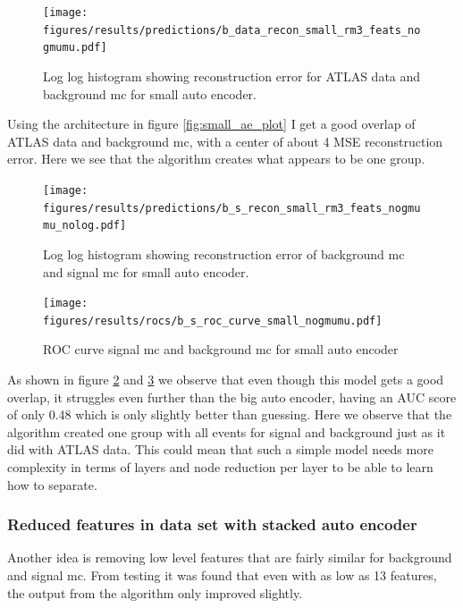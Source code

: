 \documentclass[ reprint, amsmath,amssymb, aps, nofootinbib]{revtex4-2}
\begin{document}
\begin{figure}[H]
     \centering
         \texttt{[image: figures/results/predictions/b\_data\_recon\_small\_rm3\_feats\_nogmumu.pdf]}
         \caption{Log log histogram showing reconstruction error for ATLAS data and background mc for small auto encoder. }
     \label{fig:data_b_small_pred}
\end{figure}

Using the architecture in figure \ref{fig:small_ae_plot} I get a good overlap of ATLAS data and background mc, with a center of about 4 MSE reconstruction error. Here we see that the algorithm creates what appears to be one group. 

\begin{figure}[H]    
 \centering
    \texttt{[image: figures/results/predictions/b\_s\_recon\_small\_rm3\_feats\_nogmumu\_nolog.pdf]}
    \caption{Log log histogram showing reconstruction error of background mc and signal mc for small auto encoder. }
    \label{fig:s_b_small_pred_}   
  
\end{figure}

\begin{figure}[H]    
  \centering
         \texttt{[image: figures/results/rocs/b\_s\_roc\_curve\_small\_nogmumu.pdf]}
         \caption{ROC curve signal mc and background mc for small auto encoder}
         \label{fig:s_b_small_roc}  
  
\end{figure}


As shown in figure \ref{fig:s_b_small_pred_} and \ref{fig:s_b_small_roc} we observe that even though this model gets a good overlap, it struggles even further than the big auto encoder, having an AUC score of only 0.48 which is only slightly better than guessing. Here we observe that the algorithm created one group with all events for signal and background just as it did with ATLAS data. This could mean that such a simple model needs more complexity in terms of layers and node reduction per layer to be able to learn how to separate. \par 

\subsubsection{Reduced features in data set with stacked auto encoder}

Another idea is removing low level features that are fairly similar for background and signal mc. From testing it was found that even with as low as 13 features, the output from the algorithm only improved slightly.
\end{document}
